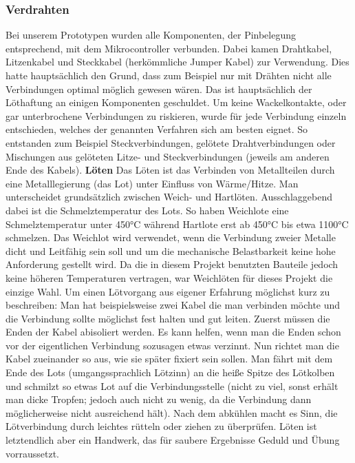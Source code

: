 \documentclass[11pt, twoside]{article}
\begin{document}
\subsubsection{Verdrahten}
Bei unserem Prototypen wurden alle Komponenten, der Pinbelegung entsprechend, mit dem Mikrocontroller verbunden. Dabei kamen Drahtkabel, Litzenkabel und Steckkabel (herkömmliche Jumper Kabel) zur Verwendung. Dies hatte hauptsächlich den Grund, dass zum Beispiel nur mit Drähten nicht alle Verbindungen optimal möglich gewesen wären. Das ist hauptsächlich der Löthaftung an einigen Komponenten geschuldet. Um keine Wackelkontakte, oder gar unterbrochene Verbindungen zu riskieren, wurde für jede Verbindung einzeln entschieden, welches der genannten Verfahren sich am besten eignet. So entstanden zum Beispiel Steckverbindungen, gelötete Drahtverbindungen oder Mischungen aus gelöteten Litze- und Steckverbindungen (jeweils am anderen Ende des Kabels).
\vspace{4mm}\newline
\textbf{Löten}\newline
\glqq Das Löten ist das Verbinden von Metallteilen durch eine Metalllegierung (das Lot) unter Einfluss von Wärme/Hitze.\grqq{} \newline
Man unterscheidet grundsätzlich zwischen Weich- und Hartlöten. Ausschlaggebend dabei ist die Schmelztemperatur des Lots. So haben Weichlote eine Schmelztemperatur unter 450°C während Hartlote erst ab 450°C bis etwa 1100°C schmelzen. \glqq Das Weichlot wird verwendet, wenn die Verbindung zweier Metalle dicht und Leitfähig sein soll und um die mechanische Belastbarkeit keine hohe Anforderung gestellt wird.\grqq{} Da die in diesem Projekt benutzten Bauteile jedoch keine höheren Temperaturen vertragen, war Weichlöten für dieses Projekt die einzige Wahl. \newline
Um einen Lötvorgang aus eigener Erfahrung möglichst kurz zu beschreiben:\newline
Man hat beispielsweise zwei Kabel die man verbinden möchte und die Verbindung sollte möglichst fest halten und gut leiten. Zuerst müssen die Enden der Kabel abisoliert werden. Es kann helfen, wenn man die Enden schon vor der eigentlichen Verbindung sozusagen etwas \glqq verzinnt\grqq{}. Nun richtet man die Kabel zueinander so aus, wie sie später fixiert sein sollen. Man fährt mit dem Ende des Lots (umgangssprachlich Lötzinn) an die heiße Spitze des Lötkolben und schmilzt so etwas Lot auf die Verbindungsstelle (nicht zu viel, sonst erhält man dicke Tropfen; jedoch auch nicht zu wenig, da die Verbindung dann möglicherweise nicht ausreichend hält). Nach dem abkühlen macht es Sinn, die Lötverbindung durch leichtes rütteln oder ziehen zu überprüfen. Löten ist letztendlich aber ein Handwerk, das für saubere Ergebnisse Geduld und Übung vorraussetzt.
\vspace{4mm}\newline
\parencite[vgl.][]{noauthor_urlnl13_nodate}
\end{document}

